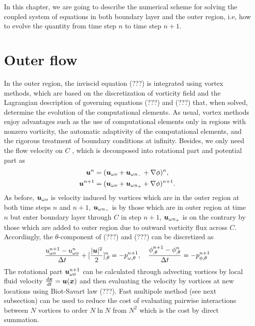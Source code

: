 
In this chapter, we are going to describe the numerical scheme for solving the coupled system of equations in both boundary layer and the outer region, i.e, how to evolve the quantity from time step $n$ to time step $n+1$.


\section{Outer flow}

In the outer region, the inviscid equation (???) is integrated using vortex methods, which are based on the discretization of vorticity field and the Lagrangian description of governing equations (???) and (???) that, when solved, determine the evolution of the computational elements.
As usual, vortex methods enjoy advantages such as the use of computational elements only in regions with nonzero vorticity, the automatic adaptivity of the computational elements, and the rigorous treatment of boundary conditions at infinity.
Besides, we only need the flow velocity on $C$ , which is decomposed into rotational part and potential part as
\begin{align}
\boldsymbol{u}^n &  = (\boldsymbol{u}_{\omega o} + \boldsymbol{u}_{\omega n_-} + \nabla \phi)^n, \\
\boldsymbol{u}^{n+1} & = (\boldsymbol{u}_{\omega o}+ \boldsymbol{u}_{\omega n_+} + \nabla \phi)^{n+1}.
\end{align}
As before, $\boldsymbol{u}_{\omega o}$ is velocity induced by vortices which are in the outer region at both time steps $n$ and $n+1$, $\boldsymbol{u}_{\omega n_-}$ is by those which are in outer region at time $n$ but enter boundary layer through $C$ in step $n+1$, $\boldsymbol{u}_{\omega n_+}$ is on the contrary by those which are added to outer region due to outward vorticity flux across $C$.
Accordingly, the $\theta$-component of (???) and (???) can be discretized as
\begin{align} \label{eqn:Eulersplit}
\frac{u_{\omega o}^{n+1}-u_{\omega o}^{n} }{\Delta t} +  [\frac{|\boldsymbol{u}|^2}{2}]^n_{,\theta}  =   -p_{\omega,\theta}^{n+1},  \quad
\frac{{\phi}_{,\theta}^{n+1}-{\phi}_{,\theta}^{n} }{\Delta t}  =   -p_{\phi,\theta}^{n+1}
\end{align}
The rotational part $\boldsymbol{u}_{\omega o}^{n+1}$ can be calculated through advecting vortices by local fluid velocity $\frac{d\boldsymbol{x}}{dt} = \boldsymbol{u}(\boldsymbol{x})$ and then evaluating the velocity by vortices at new locations using Biot-Savart law (???).
Fast multipole method (see next subsection) can be used to reduce the cost of evaluating pairwise interactions between $N$ vortices to order $N\ln N$ from $N^2$ which is the cost by direct summation.
